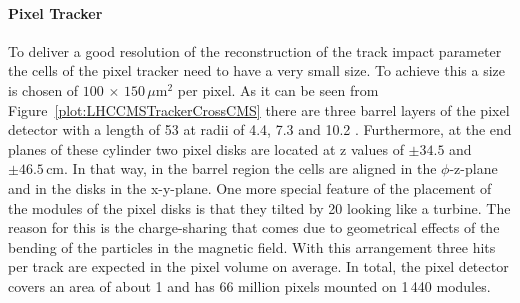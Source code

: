 \paragraph{Pixel Tracker}
To deliver a good resolution of the reconstruction of the track impact parameter the cells of the pixel tracker need to have a very small size. To achieve this a size is chosen of $\text{100}\,\times\,\text{150}\,\mu\text{m}^{\text{2}}$ per pixel. As it can be seen from Figure~\ref{plot:LHCCMSTrackerCrossCMS} there are three barrel layers of the pixel detector with a length of 53\cm{} at radii of 4.4, 7.3 and 10.2 \cm{}. Furthermore, at the end planes of these cylinder two pixel disks are located at z values of $\pm{}34.5$ and $\pm{}46.5\,\text{cm}$. In that way, in the barrel region the cells are aligned in the $\phi{}$-z-plane and in the disks in the x-y-plane. One more special feature of the placement of the modules of the pixel disks is that they tilted by 20\de{} looking like a turbine. The reason for this is the charge-sharing that comes due to geometrical effects of the bending of the particles in the magnetic field.  With this arrangement three hits per track are expected in the pixel volume on average. In total, the pixel detector covers an area of about 1\ms{} and has 66 million pixels mounted on 1\,440 modules.


